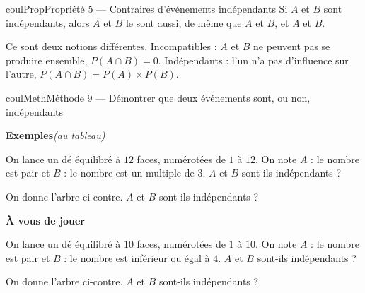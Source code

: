 \documentclass[11pt,a4paper]{article}
\makeatletter
\newcounter{lycee@signet}
\newcommand{\signet}[3][]{\stepcounter{lycee@signet}%
  \edef\lycee@dest{\if\relax\detokenize{#1}\relax
    signet.\arabic{lycee@signet}\else#1\fi}%
  \hypertarget{\lycee@dest}{}\bookmark[level=#2,dest=\lycee@dest]{#3}}
\newcounter{methode}
\newenvironment{proprietebox}[1][Propriété]%
  {\begin{boitecours}[phantom={\signet{2}{#1}}]{coulProp}{#1}}{\end{boitecours}}
\newenvironment{methodebox}[1][Méthode]{\stepcounter{methode}%
  \begin{boitecours}[phantom={\signet[methode-\arabic{methode}]{2}{#1}}]{coulMeth}{#1}}%
  {\end{boitecours}}
\newcommand{\etape}[1]{\par\smallskip\textbf{\color{coulMeth}#1}\par\nobreak\smallskip}
\newcommand{\autableau}{\hfill{\footnotesize\itshape\color{black!45}(au tableau)}}
\newcommand{\etapeexemples}{%
    \par\smallskip\textbf{\color{coulMeth}Exemples}\autableau\par\nobreak\smallskip}
\makeatother
\begin{document}
\begin{proprietebox}[Propriété 5 --- Contraires d'événements indépendants]
Si $A$ et $B$ sont indépendants, alors $\overline{A}$ et $B$ le sont aussi, de même que
$A$ et $\overline{B}$, et $\overline{A}$ et $\overline{B}$.
\end{proprietebox}

\begin{remarquebox}
Ce sont deux notions différentes. Incompatibles : $A$ et $B$ ne peuvent pas se produire
ensemble, $P(A\cap B)=0$. Indépendants : l'un n'a pas d'influence sur l'autre,
$P(A\cap B)=P(A)\times P(B)$.
\end{remarquebox}

\begin{methodebox}[Méthode 9 --- Démontrer que deux événements sont, ou non, indépendants]
\etapeexemples
\begin{minipage}[c]{0.44\linewidth}\raggedright
\begin{questions}[label=\alph*)]
  \item On lance un dé équilibré à $12$ faces, numérotées de $1$ à $12$. On note
    $A$ : \og le nombre est pair\fg{} et $B$ : \og le nombre est un multiple de
    $3$\fg. $A$ et $B$ sont-ils indépendants ?
  \item On donne l'arbre ci-contre. $A$ et $B$ sont-ils indépendants ?
\end{questions}
\end{minipage}\hfill
\begin{minipage}[c]{0.54\linewidth}\centering
{}
\end{minipage}

\etape{À vous de jouer}
\begin{minipage}[c]{0.44\linewidth}\raggedright
\begin{questions}[label=\alph*)]
  \item On lance un dé équilibré à $10$ faces, numérotées de $1$ à $10$. On note
    $A$ : \og le nombre est pair\fg{} et $B$ : \og le nombre est inférieur ou égal à
    $4$\fg. $A$ et $B$ sont-ils indépendants ?
  \item On donne l'arbre ci-contre. $A$ et $B$ sont-ils indépendants ?
\end{questions}
\end{minipage}\hfill
\begin{minipage}[c]{0.54\linewidth}\centering
{}
\end{minipage}

\end{methodebox}
\end{document}
